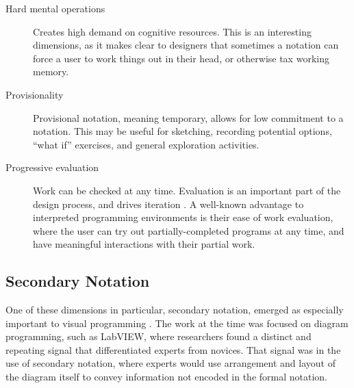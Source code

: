 \begin{description}
\item [Hard mental operations] Creates high demand on cognitive resources. This is an interesting dimensions, as it makes clear to designers that sometimes a notation can force a user to work things out in their head, or otherwise tax working memory.
\item [Provisionality] Provisional notation, meaning temporary, allows for low commitment to a notation. This may be useful for sketching, recording potential options, ``what if'' exercises, and general exploration activities.
\item [Progressive evaluation] Work can be checked at any time. Evaluation is an important part of the design process, and drives iteration \citep{atman-2003}. A well-known advantage to interpreted programming environments is their ease of work evaluation, where the user can try out partially-completed programs at any time, and have meaningful interactions with their partial work.
\end{description}


\subsection{Secondary Notation}
One of these dimensions in particular, secondary notation, emerged as especially important to visual programming \citep{petre-2006}. The work at the time was focused on diagram programming, such as LabVIEW, where researchers found a distinct and repeating signal that differentiated experts from novices. That signal was in the use of secondary notation, where experts would use arrangement and layout of the diagram itself to convey information not encoded in the formal notation. 

